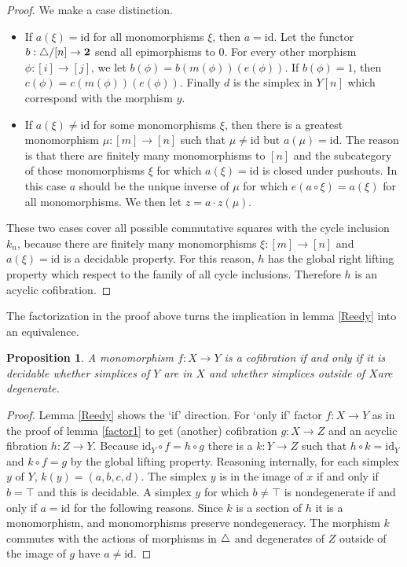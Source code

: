 \documentclass{amsart}
\theoremstyle{plain}
\newtheorem{prop}[theorem]{Proposition}
\theoremstyle{definition}
\newcommand\id{\mathrm{id}}
\newcommand\sier{{\mathbf 2}}
\begin{document}
\begin{proof}
We make a case distinction.
\begin{itemize}
\item If $a(\xi)=\id$ for all monomorphisms $\xi$, then $a=\id$. Let the functor $b:\simcat/[n]\to \sier$ send all epimorphisms to $0$. For every other morphism $\phi:[i]\to [j]$, we let $b(\phi) = b(m(\phi))(e(\phi))$. If $b(\phi)=1$, then $c(\phi) = c(m(\phi))(e(\phi))$. Finally $d$ is the simplex in $Y[n]$ which correspond with the morphism $y$.

\item If $a(\xi)\neq \id$ for some monomorphisms $\xi$, then there is a greatest monomorphism $\mu:[m]\to[n]$ such that $\mu\neq \id$ but $a(\mu)=\id$. The reason is that there are finitely many monomorphisms to $[n]$ and the subcategory of those monomorphisms $\xi$ for which $a(\xi)=\id$ is closed under pushouts. In this case $a$ should be the unique inverse of $\mu$ for which $e(a\circ \xi) = a(\xi)$ for all monomorphisms. We then let $z = a\cdot z(\mu)$.
\end{itemize}

These two cases cover all possible commutative squares with the cycle inclusion $k_n$, because there are finitely many monomorphisms $\xi:[m]\to [n]$ and $a(\xi) = \id$ is a decidable property. For this reason, $h$ has the global right lifting property which respect to the family of all cycle inclusions. Therefore $h$ is an acyclic cofibration.
\end{proof} %


The factorization in the proof above turns the implication in lemma \ref{Reedy} into an equivalence.

\begin{prop} A monomorphism $f:X\to Y$ is a cofibration if and only if it is decidable whether simplices of $Y$ are in $X$ and whether simplices outside of $X$are degenerate. \label{charcof} \end{prop}

\begin{proof} Lemma \ref{Reedy} shows the `if' direction. For `only if' factor $f:X\to Y$ as in the proof of lemma \ref{factor1} to get (another) cofibration $g:X\to Z$ and an acyclic fibration $h:Z\to Y$. Because $\id_Y\circ f = h\circ g$ there is a $k:Y\to Z$ such that $h\circ k = \id_Y$ and $k\circ f = g$ by the global lifting property. Reasoning internally, for each simplex $y$ of $Y$, $k(y)=(a,b,c,d)$. The simplex $y$ is in the image of $x$ if and only if $b=\top$ and this is decidable. A simplex $y$ for which $b\neq \top$ is nondegenerate if and only if $a=\id$ for the following reasons. Since $k$ is a section of $h$ it is a monomorphism, and monomorphisms preserve nondegeneracy. The morphism $k$ commutes with the actions of morphisms in ${\mathord{\triangle}}$ and degenerates of $Z$ outside of the image of $g$ have $a\neq\id$.
\end{proof}
\end{document}
